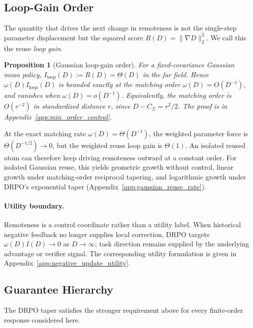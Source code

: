 \documentclass{article}
\theoremstyle{plain}
\newtheorem{proposition}[theorem]{Proposition}
\theoremstyle{definition}
\theoremstyle{remark}
\begin{document}
\subsection{Loop-Gain Order}
\label{subsec:min_order_control}

The quantity that drives the next change in remoteness is not the
single-step parameter displacement but the squared score
\(R(D)=\|\nabla D\|_2^2\). We call this the reuse \emph{loop gain}.

\begin{proposition}[Gaussian loop-gain order]
\label{prop:loop_gain_order}
For a fixed-covariance Gaussian mean policy,
\(I_{\mathrm{loop}}(D):=R(D)=\Theta(D)\) in the far field. Hence
\(\omega(D)I_{\mathrm{loop}}(D)\) is bounded exactly at the matching
order \(\omega(D)=O(D^{-1})\), and vanishes when
\(\omega(D)=o(D^{-1})\). Equivalently, the matching order is
\(O(r^{-2})\) in standardized distance \(r\), since
\(D-C_\Sigma=r^2/2\). The proof is in
Appendix~\ref{app:min_order_control}.
\end{proposition}

At the exact matching rate \(\omega(D)=\Theta(D^{-1})\), the weighted
parameter force is \(\Theta(D^{-1/2})\to0\), but the weighted reuse loop
gain is \(\Theta(1)\). An isolated reused atom can therefore keep driving
remoteness outward at a constant order. For isolated Gaussian reuse,
this yields geometric growth without control, linear growth under
matching-order reciprocal tapering, and logarithmic growth under
DRPO's exponential taper
(Appendix~\ref{app:gaussian_reuse_rate}).

\paragraph{Utility boundary.}
\label{subsec:distance_dependent_utility}
Remoteness is a control coordinate rather than a utility label. When
historical negative feedback no longer supplies local correction, DRPO
targets \(\omega(D)I(D)\to0\) as \(D\to\infty\); task direction remains
supplied by the underlying advantage or verifier signal. The corresponding
utility formulation is given in
Appendix~\ref{app:negative_update_utility}.

\subsection{Guarantee Hierarchy}
\label{sec:exponential_taper}

The DRPO taper satisfies the stronger requirement above for every
finite-order response considered here.
\end{document}
